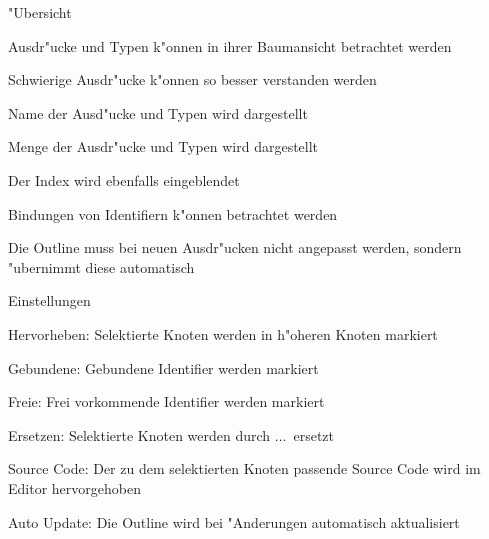 {
  \begin{itemgroup}{"Ubersicht}
    \item Ausdr"ucke und Typen k"onnen in ihrer Baumansicht betrachtet werden
    \item Schwierige Ausdr"ucke k"onnen so besser verstanden werden
    \item Name der Ausd"ucke und Typen wird dargestellt
    \item Menge der Ausdr"ucke und Typen wird dargestellt
    \item Der Index wird ebenfalls eingeblendet
    \item Bindungen von Identifiern k"onnen betrachtet werden
    \item Die Outline muss bei neuen Ausdr"ucken nicht angepasst werden,
          sondern "ubernimmt diese automatisch
  \end{itemgroup}
}

{
  \begin{itemgroup}{Einstellungen}
    \item \glqq Hervorheben\grqq: Selektierte Knoten werden in h"oheren Knoten markiert
    \item \glqq Gebundene\grqq: Gebundene Identifier werden markiert
    \item \glqq Freie\grqq: Frei vorkommende Identifier werden markiert
    \item \glqq Ersetzen\grqq: Selektierte Knoten werden durch \glqq ...\grqq\ ersetzt
    \item \glqq Source Code\grqq: Der zu dem selektierten Knoten passende Source Code
                                  wird im Editor hervorgehoben
    \item \glqq Auto Update\grqq: Die Outline wird bei "Anderungen automatisch aktualisiert
  \end{itemgroup}
}
